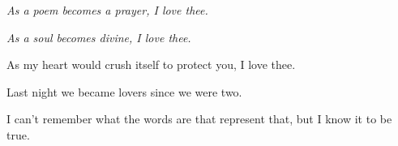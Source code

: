 

\indent

{\it As a poem becomes a prayer, I love thee.}

{\it As a soul becomes divine, I love thee.}

\noindent

As my heart would crush itself to protect you, I love thee.

Last night we became lovers since we were two.

I can't remember what the words are that represent that, but I know it
to be true.

\bye
